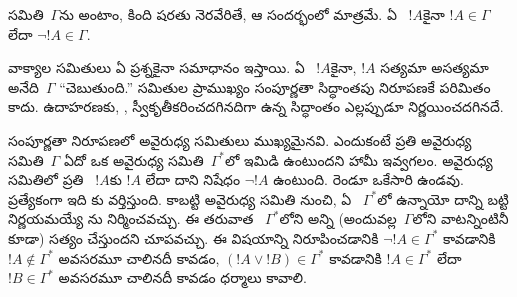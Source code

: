 \documentclass[../../../include/open-logic-section]{subfiles}
\begin{document}
      {}
      {}


\begin{defn}[సంపూర్ణ సమితి]
  సమితి~$\Gamma$ను
\emph{} అంటాం, కింది షరతు నెరవేరితే, ఆ సందర్భంలో మాత్రమే. ఏ ~$!A$కైనా
$!A \in \Gamma$ లేదా $\lnot !A \in \Gamma$.
\end{defn}

\begin{explain}
వాక్యాల  సమితులు ఏ ప్రశ్నకైనా సమాధానం ఇస్తాయి. ఏ
~$!A$కైనా, $!A$ సత్యమా అసత్యమా అనేది~$\Gamma$
``చెబుతుంది.''  సమితుల ప్రాముఖ్యం సంపూర్ణతా సిద్ధాంతపు
నిరూపణకే పరిమితం కాదు. ఉదాహరణకు, , స్వీకృతీకరించదగినదిగా
ఉన్న సిద్ధాంతం ఎల్లప్పుడూ నిర్ణయించదగినదే.
\end{explain}

\begin{explain}
సంపూర్ణతా నిరూపణలో  అవైరుధ్య సమితులు ముఖ్యమైనవి. ఎందుకంటే
ప్రతి అవైరుధ్య  సమితి~$\Gamma$ ఏదో ఒక 
అవైరుధ్య సమితి~$\Gamma^*$లో ఇమిడి ఉంటుందని హామీ ఇవ్వగలం.
 అవైరుధ్య సమితిలో ప్రతి ~$!A$కు $!A$ లేదా
దాని నిషేధం $\lnot !A$ ఉంటుంది. రెండూ ఒకేసారి ఉండవు. ప్రత్యేకంగా ఇది
కు వర్తిస్తుంది.
కాబట్టి 
 అవైరుధ్య సమితి నుంచి, ఏ
~$\Gamma^*$లో ఉన్నాయో దాన్ని బట్టి
 నిర్ణయమయ్యే ను
నిర్మించవచ్చు. ఈ  తరువాత
~$\Gamma^*$లోని అన్ని  (అందువల్ల~$\Gamma$లోని
వాటన్నింటినీ కూడా) సత్యం చేస్తుందని చూపవచ్చు. ఈ విషయాన్ని నిరూపించడానికి $\lnot !A \in \Gamma^*$ కావడానికి $!A \notin \Gamma^*$ అవసరమూ
చాలినదీ కావడం, $(!A \lor !B) \in \Gamma^*$ కావడానికి $!A \in
\Gamma^*$ లేదా $!B \in \Gamma^*$ అవసరమూ చాలినదీ కావడం ధర్మాలు
కావాలి.
\end{explain}
\end{document}
